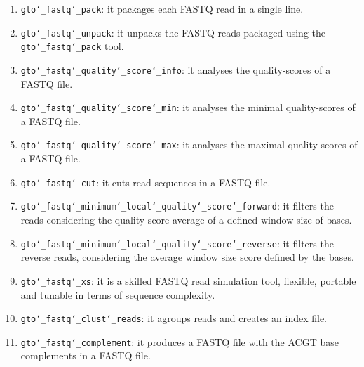 \begin{enumerate}
\item \texttt{gto\char`_fastq\char`_pack}: it packages each FASTQ read in a single line.

\item \texttt{gto\char`_fastq\char`_unpack}: it unpacks the FASTQ reads packaged using the \texttt{gto\char`_fastq\char`_pack} tool.

\item \texttt{gto\char`_fastq\char`_quality\char`_score\char`_info}: it analyses the quality-scores of a FASTQ file.

\item \texttt{gto\char`_fastq\char`_quality\char`_score\char`_min}: it analyses the minimal quality-scores of a FASTQ file.

\item \texttt{gto\char`_fastq\char`_quality\char`_score\char`_max}: it analyses the maximal quality-scores of a FASTQ file.

\item \texttt{gto\char`_fastq\char`_cut}: it cuts read sequences in a FASTQ file. 

\item \texttt{gto\char`_fastq\char`_minimum\char`_local\char`_quality\char`_score\char`_forward}: it filters the reads considering the quality score average of a defined window size of bases.

\item \texttt{gto\char`_fastq\char`_minimum\char`_local\char`_quality\char`_score\char`_reverse}: it filters the reverse reads, considering the average window size score defined by the bases.

\item \texttt{gto\char`_fastq\char`_xs}: it is a skilled FASTQ read simulation tool, flexible, portable and tunable in terms of sequence complexity.

\item \texttt{gto\char`_fastq\char`_clust\char`_reads}: it agroups reads and creates an index file.

\item \texttt{gto\char`_fastq\char`_complement}: it produces a FASTQ file with the ACGT base complements in a FASTQ file.

\end{enumerate}

